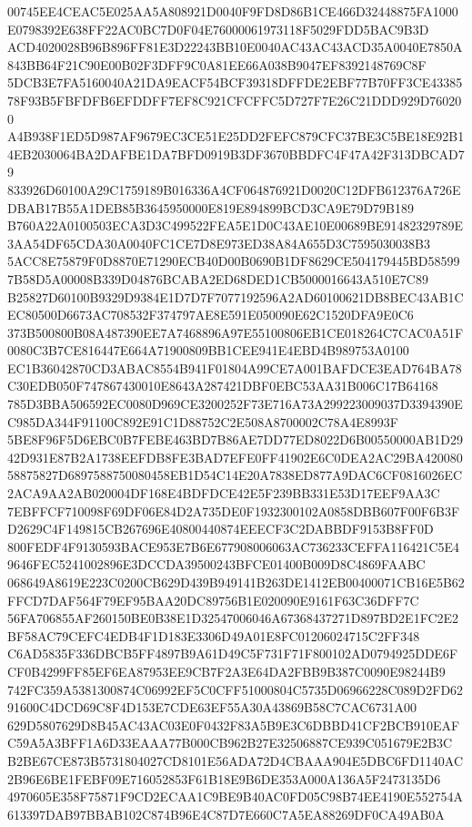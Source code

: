 \documentclass[UTF8,fontset=fandol,zihao=-4,a4paper]{ctexart}
\begin{document}
{{00745EE4CEAC5E025AA5A808921D0040F9FD8D86B1CE466D32448875FA1000E0798392E638FF22AC0BC7D0F04E76000061973118F5029FDD5BAC9B3D
ACD4020028B96B896FF81E3D22243BB10E0040AC43AC43ACD35A0040E7850A843BB64F21C90E00B02F3DFF9C0A81EE66A038B9047EF8392148769C8F
5DCB3E7FA5160040A21DA9EACF54BCF39318DFFDE2EBF77B70FF3CE4338578F93B5FBFDFB6EFDDFF7EF8C921CFCFFC5D727F7E26C21DDD929D760200
A4B938F1ED5D987AF9679EC3CE51E25DD2FEFC879CFC37BE3C5BE18E92B14EB2030064BA2DAFBE1DA7BFD0919B3DF3670BBDFC4F47A42F313DBCAD79
833926D60100A29C1759189B016336A4CF064876921D0020C12DFB612376A726EDBAB17B55A1DEB85B3645950000E819E894899BCD3CA9E79D79B189
B760A22A0100503ECA3D3C499522FEA5E1D0C43AE10E00689BE91482329789E3AA54DF65CDA30A0040FC1CE7D8E973ED38A84A655D3C7595030038B3
5ACC8E75879F0D8870E71290ECB40D00B0690B1DF8629CE504179445BD585997B58D5A00008B339D04876BCABA2ED68DED1CB5000016643A510E7C89
B25827D60100B9329D9384E1D7D7F7077192596A2AD60100621DB8BEC43AB1CEC80500D6673AC708532F374797AE8E591E050090E62C1520DFA9E0C6
373B500800B08A487390EE7A7468896A97E55100806EB1CE018264C7CAC0A51F0080C3B7CE816447E664A71900809BB1CEE941E4EBD4B989753A0100
EC1B36042870CD3ABAC8554B941F01804A99CE7A001BAFDCE3EAD764BA78C30EDB050F747867430010E8643A287421DBF0EBC53AA31B006C17B64168
785D3BBA506592EC0080D969CE3200252F73E716A73A299223009037D3394390EC985DA344F91100C892E91C1D88752C2E508A8700002C78A4E8993F
5BE8F96F5D6EBC0B7FEBE463BD7B86AE7DD77ED8022D6B00550000AB1D2942D931E87B2A1738EEFDB8FE3BAD7EFE0FF41902E6C0DEA2AC29BA420080
58875827D6897588750080458EB1D54C14E20A7838ED877A9DAC6CF0816026EC2ACA9AA2AB020004DF168E4BDFDCE42E5F239BB331E53D17EEF9AA3C
7EBFFCF710098F69DF06E84D2A735DE0F1932300102A0858DBB607F00F6B3FD2629C4F149815CB267696E40800440874EEECF3C2DABBDF9153B8FF0D
800FEDF4F9130593BACE953E7B6E677908006063AC736233CEFFA116421C5E49646FEC5241002896E3DCCDA39500243BFCE01400B009D8C4869FAABC
068649A8619E223C0200CB629D439B949141B263DE1412EB00400071CB16E5B62FFCD7DAF564F79EF95BAA20DC89756B1E020090E9161F63C36DFF7C
56FA706855AF260150BE0B38E1D32547006046A67368437271D897BD2E1FC2E2BF58AC79CEFC4EDB4F1D183E3306D49A01E8FC01206024715C2FF348
C6AD5835F336DBCB5FF4897B9A61D49C5F731F71F800102AD0794925DDE6FCF0B4299FF85EF6EA87953EE9CB7F2A3E64DA2FBB9B387C0090E98244B9
742FC359A5381300874C06992EF5C0CFF51000804C5735D06966228C089D2FD6291600C4DCD69C8F4D153E7CDE63EF55A30A43869B58C7CAC6731A00
629D5807629D8B45AC43AC03E0F0432F83A5B9E3C6DBBD41CF2BCB910EAFC59A5A3BFF1A6D33EAAA77B000CB962B27E32506887CE939C051679E2B3C
B2BE67CE873B5731804027CD8101E56ADA72D4CBAAA904E5DBC6FD1140AC2B96E6BE1FEBF09E716052853F61B18E9B6DE353A000A136A5F2473135D6
4970605E358F75871F9CD2ECAA1C9BE9B40AC0FD05C98B74EE4190E552754A613397DAB97BBAB102C874B96E4C87D7E660C7A5EA88269DF0CA49AB0A
}}
\end{document}
